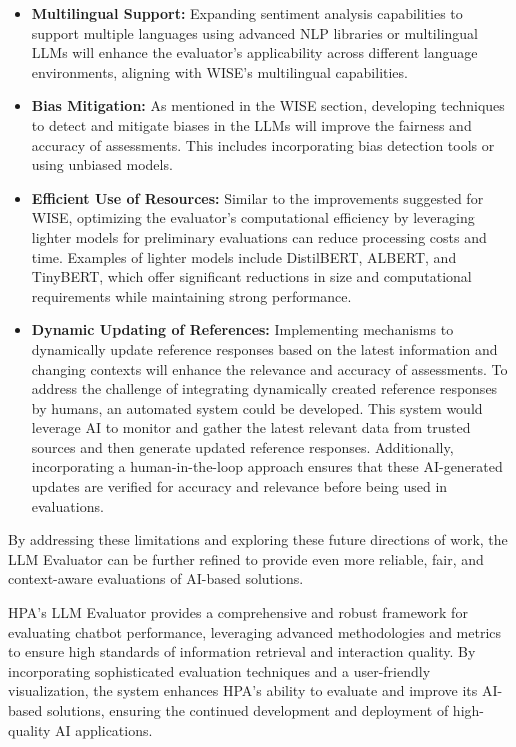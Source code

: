 \begin{itemize}
    \item \textbf{Multilingual Support:} Expanding sentiment analysis capabilities to support multiple languages using advanced NLP libraries or multilingual LLMs will enhance the evaluator's applicability across different language environments, aligning with WISE's multilingual capabilities. \cite{abdullah2021multilingual}
    \item \textbf{Bias Mitigation:} As mentioned in the WISE section, developing techniques to detect and mitigate biases in the LLMs will improve the fairness and accuracy of assessments. This includes incorporating bias detection tools or using unbiased models. \cite{ferrara2023fairness}
    \item \textbf{Efficient Use of Resources:} Similar to the improvements suggested for WISE, optimizing the evaluator's computational efficiency by leveraging lighter models for preliminary evaluations can reduce processing costs and time. Examples of lighter models include DistilBERT, ALBERT, and TinyBERT, which offer significant reductions in size and computational requirements while maintaining strong performance. \cite{sanh2019distilbert} \cite{lan2019albert} \cite{jiao2019tinybert}
    \item \textbf{Dynamic Updating of References:} Implementing mechanisms to dynamically update reference responses based on the latest information and changing contexts will enhance the relevance and accuracy of assessments. To address the challenge of integrating dynamically created reference responses by humans, an automated system could be developed. This system would leverage AI to monitor and gather the latest relevant data from trusted sources and then generate updated reference responses. Additionally, incorporating a human-in-the-loop approach ensures that these AI-generated updates are verified for accuracy and relevance before being used in evaluations. \cite{wu2022survey}
\end{itemize}

By addressing these limitations and exploring these future directions of work, the LLM Evaluator can be further refined to provide even more reliable, fair, and context-aware evaluations of AI-based solutions.

HPA's LLM Evaluator provides a comprehensive and robust framework for evaluating chatbot performance, leveraging advanced methodologies and metrics to ensure high standards of information retrieval and interaction quality. By incorporating sophisticated evaluation techniques and a user-friendly visualization, the system enhances HPA's ability to evaluate and improve its AI-based solutions, ensuring the continued development and deployment of high-quality AI applications.
